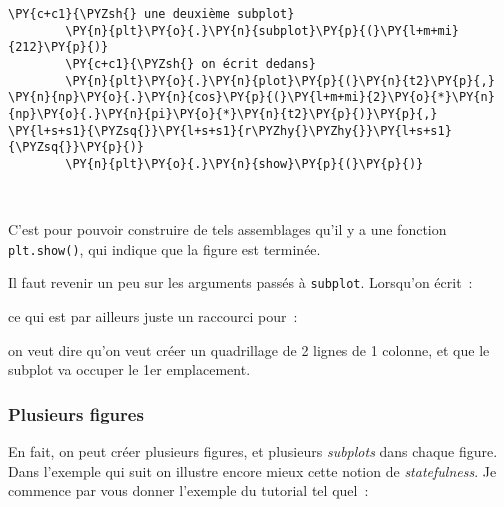 \begin{Verbatim}[commandchars=\\\{\}]
        \PY{c+c1}{\PYZsh{} une deuxième subplot}
        \PY{n}{plt}\PY{o}{.}\PY{n}{subplot}\PY{p}{(}\PY{l+m+mi}{212}\PY{p}{)}
        \PY{c+c1}{\PYZsh{} on écrit dedans}
        \PY{n}{plt}\PY{o}{.}\PY{n}{plot}\PY{p}{(}\PY{n}{t2}\PY{p}{,} \PY{n}{np}\PY{o}{.}\PY{n}{cos}\PY{p}{(}\PY{l+m+mi}{2}\PY{o}{*}\PY{n}{np}\PY{o}{.}\PY{n}{pi}\PY{o}{*}\PY{n}{t2}\PY{p}{)}\PY{p}{,} \PY{l+s+s1}{\PYZsq{}}\PY{l+s+s1}{r\PYZhy{}\PYZhy{}}\PY{l+s+s1}{\PYZsq{}}\PY{p}{)}
        \PY{n}{plt}\PY{o}{.}\PY{n}{show}\PY{p}{(}\PY{p}{)}
\end{Verbatim}


    \begin{center}
    \end{center}
    { \hspace*{\fill} \\}
    
    C'est pour pouvoir construire de tels assemblages qu'il y a une fonction
\texttt{plt.show()}, qui indique que la figure est terminée.

    Il faut revenir un peu sur les arguments passés à \texttt{subplot}.
Lorsqu'on écrit~:

\begin{Shaded}
\begin{Highlighting}[]
\NormalTok{)}
\end{Highlighting}
\end{Shaded}

ce qui est par ailleurs juste un raccourci pour~:

\begin{Shaded}
\begin{Highlighting}[]
\NormalTok{, }\NormalTok{, }\NormalTok{)}
\end{Highlighting}
\end{Shaded}

on veut dire qu'on veut créer un quadrillage de 2 lignes de 1 colonne,
et que le subplot va occuper le 1er emplacement.

    \hypertarget{plusieurs-figures}{%
\subsubsection{Plusieurs figures}\label{plusieurs-figures}}

    En fait, on peut créer plusieurs figures, et plusieurs \emph{subplots}
dans chaque figure. Dans l'exemple qui suit on illustre encore mieux
cette notion de \emph{statefulness}. Je commence par vous donner
l'exemple du tutorial tel quel~:

